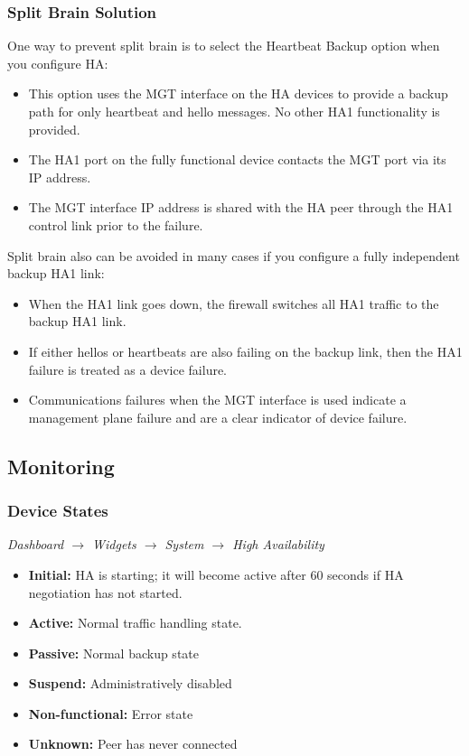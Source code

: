 \subsubsection{Split Brain Solution}
One way to prevent split brain is to select the Heartbeat Backup option when you configure HA:
\begin{itemize}
    \item This option uses the MGT interface on the HA devices to provide a backup path for only heartbeat and hello messages. No other HA1 functionality is provided.
    \item The HA1 port on the fully functional device contacts the MGT port via its IP address.
    \item The MGT interface IP address is shared with the HA peer through the HA1 control link prior to the failure.
\end{itemize}
Split brain also can be avoided in many cases if you configure a fully independent backup HA1 link:
\begin{itemize}
    \item When the HA1 link goes down, the firewall switches all HA1 traffic to the backup HA1 link.
    \item If either hellos or heartbeats are also failing on the backup link, then the HA1 failure is treated as a device failure.
    \item Communications failures when the MGT interface is used indicate a management plane failure and are a clear indicator of device failure.
\end{itemize}

\subsection{Monitoring}
\subsubsection{Device States}
\textit{Dashboard $\rightarrow$ Widgets $\rightarrow$ System $\rightarrow$ High Availability}
\begin{itemize}
    \item \textbf{Initial:} HA is starting; it will become active after 60 seconds if HA negotiation has not started.
    \item \textbf{Active:} Normal traffic handling state.
    \item \textbf{Passive:} Normal backup state
    \item \textbf{Suspend:} Administratively disabled
    \item \textbf{Non-functional:} Error state
    \item \textbf{Unknown:} Peer has never connected
\end{itemize}

